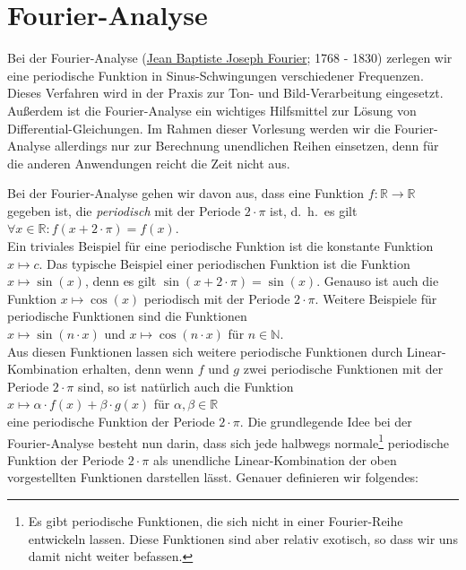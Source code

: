 \chapter{Fourier-Analyse}
Bei der Fourier-Analyse 
(\href{http://de.wikipedia.org/wiki/Joseph_Fourier}{Jean Baptiste Joseph Fourier}; 1768 - 1830) 
zerlegen wir eine 
periodische Funktion in Sinus-Schwingungen verschiedener Frequenzen.  Dieses Verfahren
wird in der Praxis zur Ton- und Bild-Verarbeitung eingesetzt.  Au{\ss}erdem ist die
Fourier-Analyse ein wichtiges Hilfsmittel zur L\"osung von Differential-Gleichungen.
Im Rahmen dieser Vorlesung werden wir die Fourier-Analyse allerdings nur zur Berechnung
unendlichen Reihen einsetzen, denn f\"ur die anderen Anwendungen reicht die Zeit 
nicht aus.

Bei der Fourier-Analyse gehen wir davon aus, dass eine Funktion 
$f:\mathbb{R} \rightarrow \mathbb{R}$ gegeben ist, die \emph{periodisch} mit der
Periode $2\cdot\pi$ ist, d.~h.~es gilt
\\[0.1cm]
\hspace*{1.3cm}
$\forall x \in\mathbb{R}: f(x+2\cdot\pi) = f(x)$.
\\[0.1cm]
Ein triviales Beispiel f\"ur eine periodische Funktion ist die konstante Funktion 
$x \mapsto c$.
Das typische Beispiel einer periodischen Funktion ist die Funktion
$x \mapsto \sin(x)$, denn es gilt $\sin(x+2\cdot\pi) = \sin(x)$.  Genauso ist auch die
Funktion $x \mapsto \cos(x)$ periodisch mit der Periode $2\cdot\pi$. 
Weitere Beispiele f\"ur periodische Funktionen sind die Funktionen 
\\[0.1cm]
\hspace*{1.3cm}
$x \mapsto \sin(n\cdot x)$ \quad und \quad $x \mapsto \cos(n\cdot x)$ 
\quad f\"ur $n\in\mathbb{N}$.
\\[0.1cm]
Aus diesen Funktionen lassen sich weitere periodische Funktionen durch Linear-Kombination
erhalten, denn wenn $f$ und $g$ zwei periodische Funktionen mit der Periode $2\cdot\pi$
sind, so ist nat\"urlich auch die Funktion
\\[0.1cm]
\hspace*{1.3cm}
$x \mapsto \alpha \cdot f(x) + \beta \cdot g(x)$ \quad f\"ur $\alpha,\beta\in\mathbb{R}$
\\[0.1cm] 
eine periodische Funktion der Periode $2\cdot\pi$.  Die grundlegende Idee bei der
Fourier-Analyse besteht nun darin, dass sich jede halbwegs normale\footnote{
Es gibt periodische Funktionen, die sich nicht in einer Fourier-Reihe entwickeln
lassen.  Diese Funktionen sind aber relativ exotisch, so dass wir uns damit nicht weiter
befassen. 
}
periodische Funktion der Periode $2 \cdot \pi$ als unendliche Linear-Kombination der oben
vorgestellten Funktionen 
darstellen l\"asst.  Genauer definieren wir folgendes: 

